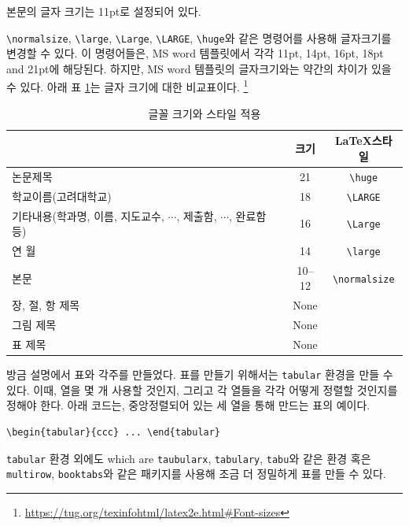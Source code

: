 \documentclass{report}
\begin{document}
본문의 글자 크기는 11pt로 설정되어 있다.

 \verb|\normalsize|, \verb|\large|, \verb|\Large|, \verb|\LARGE|, \verb|\huge|와 같은 명령어를 사용해 글자크기를 변경할 수 있다.
이 명령어들은, MS word 템플릿에서 각각 11pt, 14pt, 16pt, 18pt and 21pt에 해당된다.
하지만, MS word 템플릿의 글자크기와는 약간의 차이가 있을 수 있다.
아래 표 \ref{tab:font size}는 글자 크기에 대한 비교표이다.
\footnote{\url{https://tug.org/texinfohtml/latex2e.html#Font-sizes}}
\begin{table}[h]\centering
\begin{tabular}{>{\centering\arraybackslash}p{6cm}cc}
\hline
&크기&\LaTeX 스타일\\\hline
논문제목				&21&\verb|\huge|\\\hline
학교이름(고려대학교)	&18&\verb|\LARGE|\\\hline
기타내용(학과명, 이름, 지도교수, \(\cdots\), 제출함, \(\cdots\), 완료함 등)
					&16&\verb|\Large|\\\hline
연 월				&14&\verb|\large|\\\hline
본문					&10--12&\verb|\normalsize|\\\hline
장, 절, 항 제목		&None&\\\hline
그림 제목			&None&\\\hline
표 제목				&None&\\\hline
\end{tabular}
\caption{글꼴 크기와 스타일 적용}\label{tab:font size}
\end{table}


방금 설명에서 표와 각주를 만들었다.
표를 만들기 위해서는 \texttt{tabular} 환경을 만들 수 있다.
이때, 열을 몇 개 사용할 것인지, 그리고 각 열들을 각각 어떻게 정렬할 것인지를 정해야 한다.
아래 코드는, 중앙정렬되어 있는 세 열을 통해 만드는 표의 예이다.
\begin{verbatim}
\begin{tabular}{ccc} ... \end{tabular}
\end{verbatim}
\texttt{tabular} 환경 외에도 which are \texttt{taubularx}, \texttt{tabulary}, \texttt{tabu}와 같은 환경 혹은 \texttt{multirow}, \texttt{booktabs}와 같은 패키지를 사용해 조금 더 정밀하게 표를 만들 수 있다.
\end{document}
